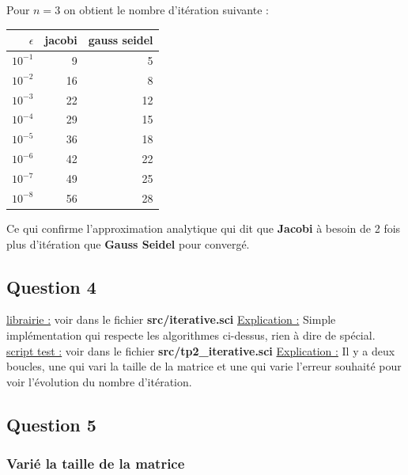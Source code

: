 \documentclass[11pt]{article}
\begin{document}
Pour $n = 3$ on obtient le nombre d'itération suivante :

\begin{center}
  \begin{tabular}{|r|r|r|}
    \hline
    $\epsilon$ & jacobi & gauss seidel \\ \hline
    $10^{-1}$ & 9 & 5 \\ \hline
    $10^{-2}$ & 16 & 8 \\ \hline
    $10^{-3}$ & 22 & 12 \\ \hline
    $10^{-4}$ & 29 & 15 \\ \hline
    $10^{-5}$ & 36 & 18 \\ \hline
    $10^{-6}$ & 42 & 22 \\ \hline
    $10^{-7}$ & 49 & 25 \\ \hline
    $10^{-8}$ & 56 & 28 \\ \hline
  \end{tabular}
\end{center}

Ce qui confirme l'approximation analytique qui dit que \textbf{Jacobi}
à besoin de 2 fois plus d'itération que \textbf{Gauss Seidel} pour
convergé.

\subsection{Question 4}

\underline{librairie :} voir dans le fichier
\textbf{src/iterative.sci}\newline
\underline{Explication :}\newline
Simple implémentation qui respecte les algorithmes ci-dessus, rien à
dire de spécial.\newline
\vspace{5mm}
\underline{script test :} voir dans le fichier
\textbf{src/tp2\_iterative.sci}\newline
\underline{Explication :}\newline
Il y a deux boucles, une qui vari la taille de la matrice et une qui
varie l'erreur souhaité pour voir l'évolution du nombre d'itération.

\subsection{Question 5}

\subsubsection{Varié la taille de la matrice}
\end{document}

